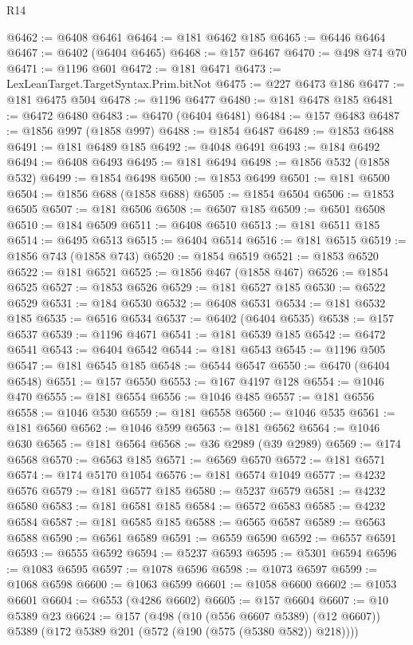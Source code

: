 \begin{lexlean}{R14}
\begin{coremodule}
@6462 := @6408 @6461
@6464 := @181 @6462 @185
@6465 := @6446 @6464
@6467 := @6402 (@6404 @6465)
@6468 := @157 @6467
@6470 := @498 @74 @70
@6471 := @1196 @601
@6472 := @181 @6471
@6473 := LexLeanTarget.TargetSyntax.Prim.bitNot
@6475 := @227 @6473 @186
@6477 := @181 @6475 @504
@6478 := @1196 @6477
@6480 := @181 @6478 @185
@6481 := @6472 @6480
@6483 := @6470 (@6404 @6481)
@6484 := @157 @6483
@6487 := @1856 @997 (@1858 @997)
@6488 := @1854 @6487
@6489 := @1853 @6488
@6491 := @181 @6489 @185
@6492 := @4048 @6491
@6493 := @184 @6492
@6494 := @6408 @6493
@6495 := @181 @6494
@6498 := @1856 @532 (@1858 @532)
@6499 := @1854 @6498
@6500 := @1853 @6499
@6501 := @181 @6500
@6504 := @1856 @688 (@1858 @688)
@6505 := @1854 @6504
@6506 := @1853 @6505
@6507 := @181 @6506
@6508 := @6507 @185
@6509 := @6501 @6508
@6510 := @184 @6509
@6511 := @6408 @6510
@6513 := @181 @6511 @185
@6514 := @6495 @6513
@6515 := @6404 @6514
@6516 := @181 @6515
@6519 := @1856 @743 (@1858 @743)
@6520 := @1854 @6519
@6521 := @1853 @6520
@6522 := @181 @6521
@6525 := @1856 @467 (@1858 @467)
@6526 := @1854 @6525
@6527 := @1853 @6526
@6529 := @181 @6527 @185
@6530 := @6522 @6529
@6531 := @184 @6530
@6532 := @6408 @6531
@6534 := @181 @6532 @185
@6535 := @6516 @6534
@6537 := @6402 (@6404 @6535)
@6538 := @157 @6537
@6539 := @1196 @4671
@6541 := @181 @6539 @185
@6542 := @6472 @6541
@6543 := @6404 @6542
@6544 := @181 @6543
@6545 := @1196 @505
@6547 := @181 @6545 @185
@6548 := @6544 @6547
@6550 := @6470 (@6404 @6548)
@6551 := @157 @6550
@6553 := @167 @4197 @128
@6554 := @1046 @470
@6555 := @181 @6554
@6556 := @1046 @485
@6557 := @181 @6556
@6558 := @1046 @530
@6559 := @181 @6558
@6560 := @1046 @535
@6561 := @181 @6560
@6562 := @1046 @599
@6563 := @181 @6562
@6564 := @1046 @630
@6565 := @181 @6564
@6568 := @36 @2989 (@39 @2989)
@6569 := @174 @6568
@6570 := @6563 @185
@6571 := @6569 @6570
@6572 := @181 @6571
@6574 := @174 @5170 @1054
@6576 := @181 @6574 @1049
@6577 := @4232 @6576
@6579 := @181 @6577 @185
@6580 := @5237 @6579
@6581 := @4232 @6580
@6583 := @181 @6581 @185
@6584 := @6572 @6583
@6585 := @4232 @6584
@6587 := @181 @6585 @185
@6588 := @6565 @6587
@6589 := @6563 @6588
@6590 := @6561 @6589
@6591 := @6559 @6590
@6592 := @6557 @6591
@6593 := @6555 @6592
@6594 := @5237 @6593
@6595 := @5301 @6594
@6596 := @1083 @6595
@6597 := @1078 @6596
@6598 := @1073 @6597
@6599 := @1068 @6598
@6600 := @1063 @6599
@6601 := @1058 @6600
@6602 := @1053 @6601
@6604 := @6553 (@4286 @6602)
@6605 := @157 @6604
@6607 := @10 @5389 @23
@6624 := @157
    (@498
      (@10 (@556 @6607 @5389) (@12 @6607))
      @5389
      (@172 @5389 @201 (@572 (@190 (@575 (@5380 @582)) @218))))

\end{coremodule}
\end{lexlean}
